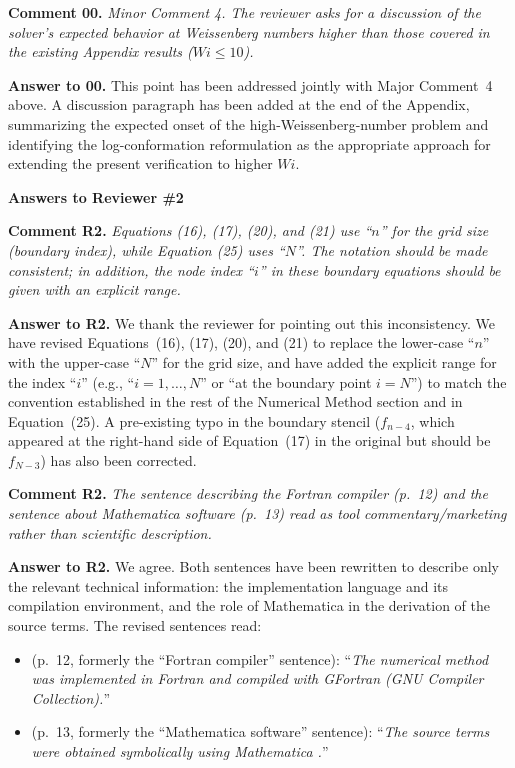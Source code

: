 \documentclass[12pt]{article}
\newcounter{question}
\newcommand{\name}{00}
\newcommand{\question}[1]{\stepcounter{question} \noindent \textbf{Comment \name.\thequestion} \emph{#1} }
\newcommand{\answer}[1]{\noindent \textbf{Answer to \name.\thequestion} #1 \mbox{}\\}
\newcommand{\newperson}[2]{\renewcommand{\name}{#2} \setcounter{question}{0} \newpage \noindent \textbf{\Large Answers to #1} \\}
\begin{document}
\vspace{3mm}

\question{Minor Comment 4. The reviewer asks for a discussion of the solver's expected behavior at Weissenberg numbers higher than those covered in the existing Appendix results ($Wi \leq 10$).}

\answer{This point has been addressed jointly with Major Comment~4 above. A discussion paragraph has been added at the end of the Appendix, summarizing the expected onset of the high-Weissenberg-number problem and identifying the log-conformation reformulation as the appropriate approach for extending the present verification to higher $Wi$.}

\vspace{3mm}

\newperson{Reviewer \#2}{R2}

\vspace{3mm}

\question{Equations (16), (17), (20), and (21) use ``$n$'' for the grid size (boundary index), while Equation (25) uses ``$N$''. The notation should be made consistent; in addition, the node index ``$i$'' in these boundary equations should be given with an explicit range.}

\answer{We thank the reviewer for pointing out this inconsistency. We have revised Equations~(16), (17), (20), and (21) to replace the lower-case ``$n$'' with the upper-case ``$N$'' for the grid size, and have added the explicit range for the index ``$i$'' (e.g., ``$i = 1, \dots, N$'' or ``at the boundary point $i = N$'') to match the convention established in the rest of the Numerical Method section and in Equation~(25). A pre-existing typo in the boundary stencil ($f_{n-4}$, which appeared at the right-hand side of Equation~(17) in the original but should be $f_{N-3}$) has also been corrected.}

\vspace{3mm}

\question{The sentence describing the Fortran compiler (p.~12) and the sentence about Mathematica software (p.~13) read as tool commentary/marketing rather than scientific description.}

\answer{We agree. Both sentences have been rewritten to describe only the relevant technical information: the implementation language and its compilation environment, and the role of Mathematica in the derivation of the source terms. The revised sentences read:
\begin{itemize}
  \item (p.~12, formerly the ``Fortran compiler'' sentence): ``\emph{The numerical method was implemented in Fortran and compiled with GFortran (GNU Compiler Collection).}''
  \item (p.~13, formerly the ``Mathematica software'' sentence): ``\emph{The source terms were obtained symbolically using Mathematica \cite{Mathematica}.}''
\end{itemize}}

\vspace{3mm}


\end{document}
